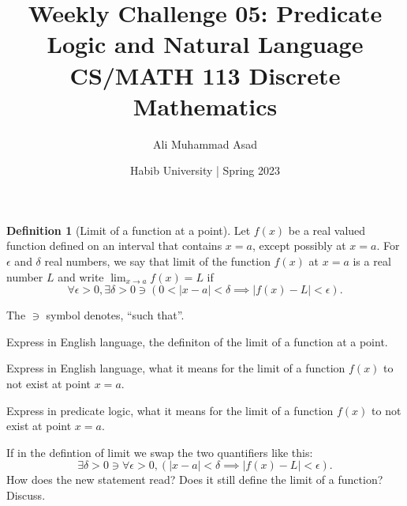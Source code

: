 \documentclass[a4paper]{exam}
\title{Weekly Challenge 05: Predicate Logic and Natural Language\\CS/MATH 113 Discrete Mathematics}
\author{Ali Muhammad Asad}  %
\date{Habib University | Spring 2023}
\theoremstyle{definition}
\newtheorem{definition}{Definition}
\begin{document}
\maketitle

\begin{questions}

  \begin{definition}[Limit of a function at a point]
    Let $f(x)$ be a real valued function defined on an interval that contains $x=a$, except possibly at $x=a$. For $\epsilon$ and $\delta$ real numbers, we say that limit of the function $f(x)$ at $x=a$ is a real number $L$ and write $\lim_{x \to a} f(x)=L$ if 
    \[
      \forall \epsilon>0, \exists \delta>0 \ni (0<|x-a|<\delta \implies |f(x)-L|<\epsilon).
    \]
  \end{definition}
  The $\ni$ symbol denotes, ``such that''.
  \begin{parts}
  \item Express in English language, the definiton of the limit of a function at a point.
    \begin{solution}
    \end{solution}
  \item Express in English language, what it means for the limit of a function $f(x)$ to not exist at point $x=a$.
    \begin{solution}
    \end{solution}
  \item Express in predicate logic, what it means for the limit of a function $f(x)$ to not exist at point $x=a$.
    \begin{solution}
    \end{solution}
  \item If in the defintion of limit we swap the two quantifiers like this:
    \[
      \exists \delta>0 \ni \forall \epsilon>0, (|x-a|<\delta \implies |f(x)-L|<\epsilon).
    \]
    How does the new statement read? Does it still define the limit of a function? Discuss.
    \begin{solution}
    \end{solution}
  \end{parts}
\end{questions}
\end{document}
